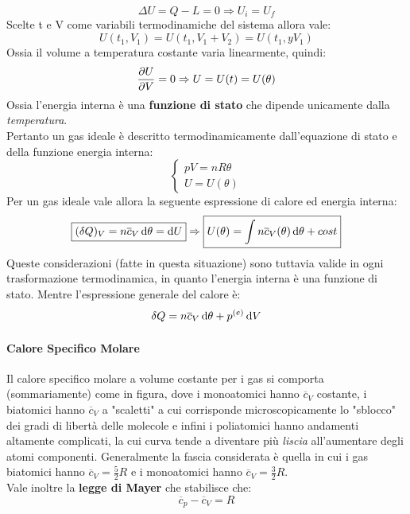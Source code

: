 \documentclass{article}
\newcommand{\then}{\ensuremath{\Rightarrow}}
\begin{document}
\[\Delta U=Q-L=0\then U_i=U_f\]
Scelte t e V come variabili termodinamiche del sistema allora vale:
\[U(t_1,V_1)=U(t_1,V_1+V_2)=U(t_1,yV_1)\]
Ossia il volume a temperatura costante varia linearmente, quindi:
\[\pdv{U}{V}=0\then U=U(t)=U(\theta)\]
Ossia l'energia interna è una \textbf{funzione di stato} che dipende unicamente dalla \textit{temperatura}.\\
Pertanto un gas ideale è descritto termodinamicamente dall'equazione di stato e della funzione energia interna:
\begin{equation}
\begin{cases}
pV=nR\theta\\
U=U(\theta)
\end{cases}
\end{equation}
Per un gas ideale vale allora la seguente espressione di calore ed energia interna:
\begin{equation}
\boxed{(\delta Q)_V=n\overline{c}_V\dif\theta=\dif U}\then \boxed{U(\theta)=\int n\overline{c}_V(\theta)\dif\theta+cost}
\end{equation}
Queste considerazioni (fatte in questa situazione) sono tuttavia valide in ogni trasformazione termodinamica, in quanto l'energia interna è una funzione di stato. Mentre l'espressione generale del calore è:
\[\delta Q=n\overline{c}_V\dif\theta+p^{(e)}\dif V\]
\paragraph{Calore Specifico Molare}
Il calore specifico molare a volume costante per i gas si comporta (sommariamente) come in figura, dove i monoatomici hanno $\overline{c}_V$ costante, i biatomici hanno $\overline{c}_V$ a "scaletti" a cui corrisponde microscopicamente lo "sblocco" dei gradi di libertà delle molecole e infini i poliatomici hanno andamenti altamente complicati, la cui curva tende a diventare più \textit{liscia} all'aumentare degli atomi componenti. Generalmente la fascia considerata è quella in cui i gas biatomici hanno $\overline{c}_V=\frac{5}{2}R$ e i monoatomici hanno $\overline{c}_V=\frac{3}{2}R$.\\
Vale inoltre la \textbf{legge di Mayer} che stabilisce che:
\begin{equation}
\boxed{\overline{c}_p-\overline{c}_V=R}
\end{equation}
\end{document}
